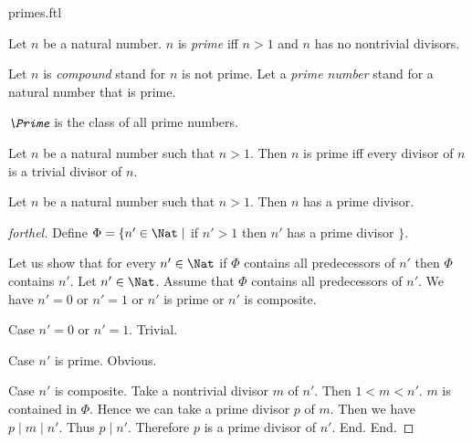 \documentclass{naproche-library}
\begin{document}
\begin{smodule}[title=Prime Numbers]{primes.ftl}

\begin{definition}[forthel,id=ARITHMETIC_10_5450464558579712]
  Let $n$ be a natural number.
  $n$ is \emph{prime} iff $n > 1$ and $n$ has no nontrivial divisors.

  Let $n$ is \emph{compound} stand for $n$ is not prime.
  Let a \emph{prime number} stand for a natural number that is prime.
\end{definition}

\begin{definition}[forthel,id=ARITHMETIC_10_3834705971511296]
  $\emph{\Prime}$ is the class of all prime numbers.
\end{definition}

\begin{proposition}[forthel,id=ARITHMETIC_10_7801379464675328]
  Let $n$ be a natural number such that $n > 1$.
  Then $n$ is prime iff every divisor of $n$ is a trivial divisor of $n$.
\end{proposition}

\begin{proposition}[forthel,id=ARITHMETIC_10_3606185106210816]
  Let $n$ be a natural number such that $n > 1$.
  Then $n$ has a prime divisor.
\end{proposition}
\begin{proof}[forthel]
  Define $\Phi = \{ n' \in \Nat \mid$ if $n' > 1$ then $n'$ has a prime divisor $\}$.

  Let us show that for every $n' \in \Nat$ if $\Phi$ contains all
  predecessors of $n'$ then $\Phi$ contains $n'$.
    Let $n' \in \Nat$.
    Assume that $\Phi$ contains all predecessors of $n'$.
    We have $n' = 0$ or $n' = 1$ or $n'$ is prime or $n'$ is composite.

    Case $n' = 0$ or $n' = 1$. Trivial.

    Case $n'$ is prime. Obvious.

    Case $n'$ is composite.
      Take a nontrivial divisor $m$ of $n'$.
      Then $1 < m < n'$.
      $m$ is contained in $\Phi$.
      Hence we can take a prime divisor $p$ of $m$.
      Then we have $p \mid m \mid n'$.
      Thus $p \mid n'$.
      Therefore $p$ is a prime divisor of $n'$.
    End.
  End.


\end{proof}
\end{smodule}
\end{document}
